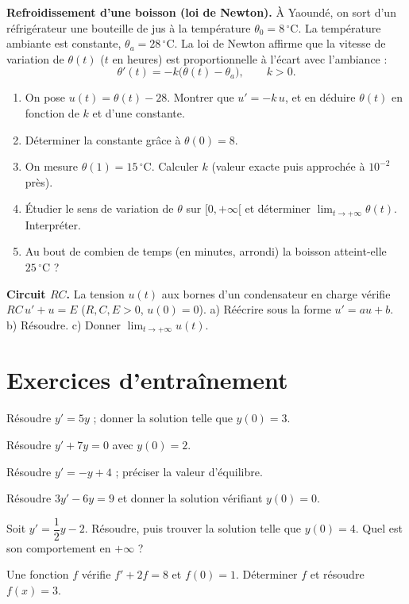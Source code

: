 \exo{} \textbf{Refroidissement d'une boisson (loi de Newton).}\;
À Yaoundé, on sort d'un réfrigérateur une bouteille de jus à la température
$\theta_0=8\,^\circ\mathrm{C}$. La température ambiante est constante,
$\theta_a=28\,^\circ\mathrm{C}$. La loi de Newton affirme que la vitesse de
variation de $\theta(t)$ ($t$ en heures) est proportionnelle à l'écart avec
l'ambiance :
\[
\theta'(t)=-k\big(\theta(t)-\theta_a\big),\qquad k>0.
\]
\begin{enumerate}[label=\arabic*)]
\item On pose $u(t)=\theta(t)-28$. Montrer que $u'=-k\,u$, et en déduire
$\theta(t)$ en fonction de $k$ et d'une constante.
\item Déterminer la constante grâce à $\theta(0)=8$.
\item On mesure $\theta(1)=15\,^\circ\mathrm{C}$. Calculer $k$ (valeur exacte
puis approchée à $10^{-2}$ près).
\item Étudier le sens de variation de $\theta$ sur $[0,+\infty[$ et déterminer
$\displaystyle\lim_{t\to+\infty}\theta(t)$. Interpréter.
\item Au bout de combien de temps (en minutes, arrondi) la boisson atteint-elle
$25\,^\circ\mathrm{C}$ ?
\end{enumerate}

\exo{} \textbf{Circuit $RC$.} La tension $u(t)$ aux bornes d'un
condensateur en charge vérifie $RC\,u'+u=E$ ($R,C,E>0$, $u(0)=0$).
a) Réécrire sous la forme $u'=au+b$. b) Résoudre. c) Donner $\lim_{t\to+\infty}u(t)$.

\section{Exercices d'entraînement}


\exo{} Résoudre $y'=5y$ ; donner la solution telle que $y(0)=3$.

\exo{} Résoudre $y'+7y=0$ avec $y(0)=2$.

\exo{} Résoudre $y'=-y+4$ ; préciser la valeur d'équilibre.

\exo{} Résoudre $3y'-6y=9$ et donner la solution vérifiant $y(0)=0$.

\exo{} Soit $y'=\dfrac12 y-2$. Résoudre, puis trouver la solution telle
que $y(0)=4$. Quel est son comportement en $+\infty$ ?

\exo{} Une fonction $f$ vérifie $f'+2f=8$ et $f(0)=1$. Déterminer $f$ et
résoudre $f(x)=3$.

